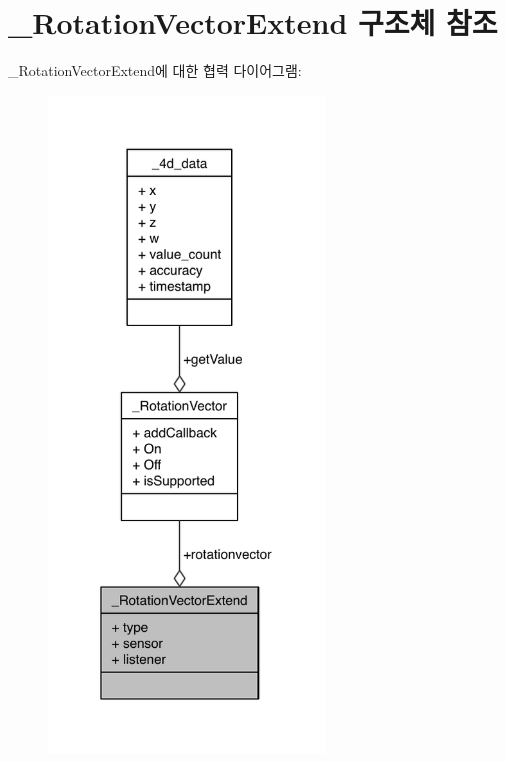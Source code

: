 \hypertarget{struct___rotation_vector_extend}{\section{\-\_\-\-Rotation\-Vector\-Extend 구조체 참조}
\label{struct___rotation_vector_extend}
}


\-\_\-\-Rotation\-Vector\-Extend에 대한 협력 다이어그램\-:\nopagebreak
\begin{figure}[H]
\begin{center}
\leavevmode
\includegraphics[width=208pt]{da/d0c/struct___rotation_vector_extend__coll__graph}
\end{center}
\end{figure}
